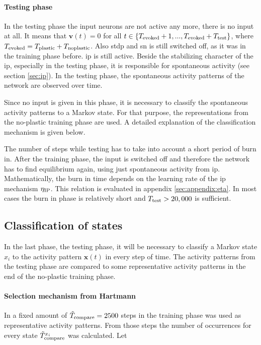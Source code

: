 \paragraph{Testing phase}

In the testing phase the input neurons are not active any more, there is no input at all. It means that $\bm v(t) = 0$ for all $t \in \{T_{\text{evoked}}+1, ..., T_{\text{evoked}}+T_{\text{test}}\}$, where $T_{\text{evoked}} = T_{\text{plastic}} + T_{\text{noplastic}}$. Also \ac{stdp} and \ac{sn} is still switched off, as it was in the training phase before. \ac{ip} is still active. Beside the stabilizing character of the \acs{ip}, especially in the testing phase, it is responsible for spontaneous activity (see section \ref{sec:ip}). In the testing phase, the spontaneous activity patterns of the network are observed over time.

Since no input is given in this phase, it is necessary to classify the spontaneous activity patterns to a Markov state. For that purpose, the representations from the no-plastic training phase are used. A detailed explanation of the classification mechanism is given below.

The number of steps while testing has to take into account a short period of burn in. After the training phase, the input is switched off and therefore the network has to find equilibrium again, using just spontaneous activity from \acl{ip}. Mathematically, the burn in time depends on the learning rate of the \acs{ip} mechanism $\eta_{\text{IP}}$. This relation is evaluated in appendix \ref{sec:appendix:eta}. In most cases the burn in phase is relatively short and $T_{\text{test}} > 20,000$ is sufficient.

\subsection{Classification of states}
\label{sec:state-classification}

In the last phase, the testing phase, it will be necessary to classify a Markov state $x_i$ to the activity pattern $\bm x(t)$ in every step of time. The activity patterns from the testing phase are compared to some representative activity patterns in the end of the no-plastic training phase.

\paragraph{Selection mechanism from Hartmann}

In \textcite{hartmann2015s} a fixed amount of $\tilde{T}_{\text{compare}} = 2500$ steps in the training phase was used as representative activity patterns. From those steps the number of occurrences for every state $\tilde{T}_{\text{compare}}^{x_i}$ was calculated. Let

